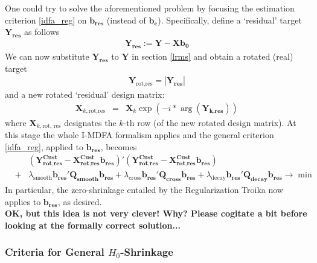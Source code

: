 \documentclass[11pt]{article}
\begin{document}
One could try to solve the aforementioned problem by focusing the estimation criterion  \ref{idfa_reg} on  $\mathbf{b_{\textrm{res}}}$ (instead of $\mathbf{b_{c}}$). Specifically, define a `residual' target $\mathbf{Y_{\textrm{res}}}$ as follows
\begin{eqnarray}\label{res_def}
\mathbf{Y_{\textrm{res}}}:=\mathbf{Y}-\mathbf{X}\mathbf{b_0}
\end{eqnarray}
We can now substitute  $\mathbf{Y_{\textrm{res}}}$ to $\mathbf{Y}$ in section \ref{lrms} and obtain a rotated (real) target 
\begin{eqnarray*}
 \mathbf{Y}_{\textrm{rot,res}}=\left|\mathbf{Y_\textrm{res}}\right|
\end{eqnarray*}
and a new rotated `residual' design matrix:
\begin{eqnarray}\label{desmatrot}
\mathbf{X}_{k,\textrm{rot,res}}&=&\mathbf{X}_k \exp\left(-i*\arg\left(\mathbf{Y_{\textrm{k,res}}}  \right)\right)
\end{eqnarray}
where $\mathbf{X}_{k,\textrm{rot, res}}$ designates the $k$-th row (of the new rotated design matrix). At this stage the whole I-MDFA formalism applies and the general criterion \ref{idfa_reg}, applied to $\mathbf{b_{\textrm{res}}}$, becomes
\begin{eqnarray*}
&&(\mathbf{Y_{\textrm{rot,res}}^{\textrm{Cust}}-X_{\textrm{rot,res}}^{\textrm{Cust}}b_{\textrm{res}}})'(\mathbf{Y_{\textrm{rot,res}}^{\textrm{Cust}}-X_{\textrm{rot,res}}^{\textrm{Cust}}b_{\textrm{res}}})\nonumber\\
&+&\lambda_{\textrm{smooth}}\mathbf{b_{\textrm{res}}'Q_{smooth}b_{\textrm{res}}}
+\lambda_{\textrm{cross}}\mathbf{b_{\textrm{res}}'Q_{cross}b_{\textrm{res}}}+\lambda_{\textrm{decay}}\mathbf{b_{\textrm{res}}'Q_{decay}b_{\textrm{res}}}\to\min
\end{eqnarray*}
 In particular, the zero-shrinkage entailed by the Regularization Troika now applies to $\mathbf{b_{\textrm{res}}}$, as desired.\\

\textbf{OK, but this idea is not very clever! Why? Please cogitate a bit before looking at the formally correct solution...}\\




\subsubsection{Criteria for General $H_0$-Shrinkage}
\end{document}
